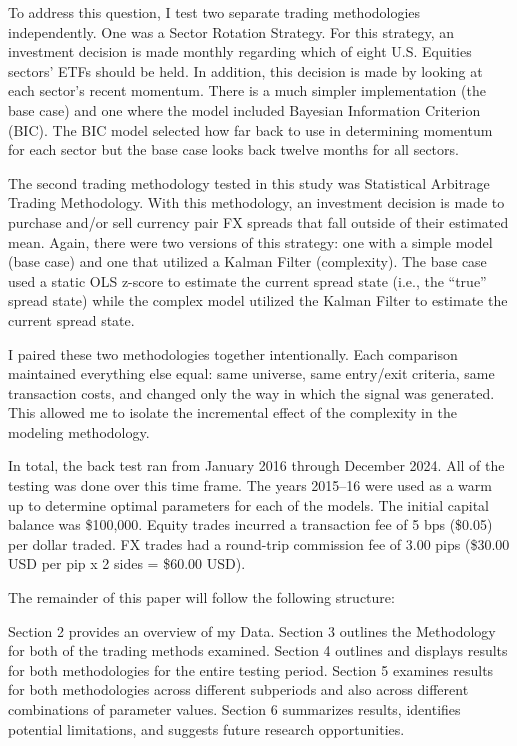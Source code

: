 \documentclass[12pt]{article}
\begin{document}
To address this question, I test two separate trading methodologies independently. One was a Sector Rotation Strategy. For this strategy, an investment decision is made monthly regarding which of eight U.S. Equities sectors' ETFs should be held. In addition, this decision is made by looking at each sector's recent momentum. There is a much simpler implementation (the base case) and one where the model included Bayesian Information Criterion (BIC). The BIC model selected how far back to use in determining momentum for each sector but the base case looks back twelve months for all sectors.

The second trading methodology tested in this study was Statistical Arbitrage Trading Methodology. With this methodology, an investment decision is made to purchase and/or sell currency pair FX spreads that fall outside of their estimated mean. Again, there were two versions of this strategy: one with a simple model (base case) and one that utilized a Kalman Filter (complexity). The base case used a static OLS z-score to estimate the current spread state (i.e., the ``true'' spread state) while the complex model utilized the Kalman Filter to estimate the current spread state.

I paired these two methodologies together intentionally. Each comparison maintained everything else equal: same universe, same entry/exit criteria, same transaction costs, and changed only the way in which the signal was generated. This allowed me to isolate the incremental effect of the complexity in the modeling methodology.

In total, the back test ran from January 2016 through December 2024. All of the testing was done over this time frame. The years 2015--16 were used as a warm up to determine optimal parameters for each of the models. The initial capital balance was \$100,000. Equity trades incurred a transaction fee of 5 bps (\$0.05) per dollar traded. FX trades had a round-trip commission fee of 3.00 pips (\$30.00 USD per pip x 2 sides = \$60.00 USD).

The remainder of this paper will follow the following structure:

Section 2 provides an overview of my Data. Section 3 outlines the Methodology for both of the trading methods examined. Section 4 outlines and displays results for both methodologies for the entire testing period. Section 5 examines results for both methodologies across different subperiods and also across different combinations of parameter values. Section 6 summarizes results, identifies potential limitations, and suggests future research opportunities.
\end{document}
